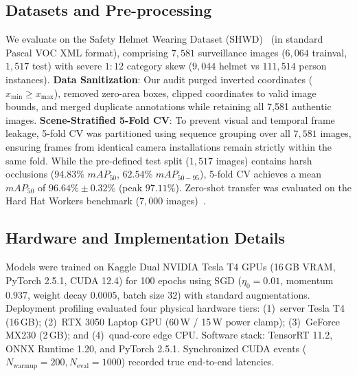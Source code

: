 \documentclass[conference]{IEEEtran}
\begin{document}
\subsection{Datasets and Pre-processing}
\label{subsec:datasets}
We evaluate on the Safety Helmet Wearing Dataset (SHWD)~\cite{shwd_dataset} (in standard Pascal VOC XML format), comprising $7,581$ surveillance images ($6,064$ trainval, $1,517$ test) with severe $1:12$ category skew ($9,044$ helmet vs $111,514$ person instances). 
\textbf{Data Sanitization}: Our audit purged inverted coordinates ($x_{\min} \ge x_{\max}$), removed zero-area boxes, clipped coordinates to valid image bounds, and merged duplicate annotations while retaining all 7,581 authentic images.
\textbf{Scene-Stratified 5-Fold CV}: To prevent visual and temporal frame leakage, 5-fold CV was partitioned using sequence grouping over all $7,581$ images, ensuring frames from identical camera installations remain strictly within the same fold. While the pre-defined test split ($1,517$ images) contains harsh occlusions ($94.83\%$ $mAP_{50}$, $62.54\%$ $mAP_{50-95}$), 5-fold CV achieves a mean $mAP_{50}$ of $96.64\% \pm 0.32\%$ (peak $97.11\%$). Zero-shot transfer was evaluated on the Hard Hat Workers benchmark ($7,000$ images)~\cite{hard_hat_workers_mvd}.

\subsection{Hardware and Implementation Details}
\label{subsec:hardware}
Models were trained on Kaggle Dual NVIDIA Tesla T4 GPUs (16\,GB VRAM, PyTorch 2.5.1, CUDA 12.4) for 100 epochs using SGD ($\eta_0=0.01$, momentum $0.937$, weight decay $0.0005$, batch size $32$) with standard augmentations. Deployment profiling evaluated four physical hardware tiers: (1)~server Tesla T4 (16\,GB); (2)~RTX 3050 Laptop GPU (60\,W / 15\,W power clamp); (3)~GeForce MX230 (2\,GB); and (4)~quad-core edge CPU. Software stack: TensorRT 11.2, ONNX Runtime 1.20, and PyTorch 2.5.1. Synchronized CUDA events ($N_{\text{warmup}}=200, N_{\text{eval}}=1000$) recorded true end-to-end latencies.
\end{document}
